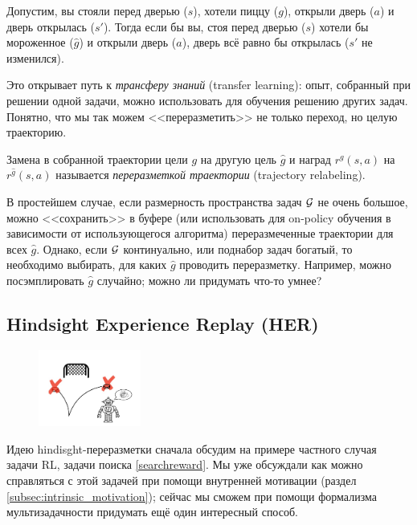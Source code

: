 \begin{example}
Допустим, вы стояли перед дверью ($s$), хотели пиццу ($g$), открыли дверь ($a$) и дверь открылась ($s'$). Тогда если бы вы, стоя перед дверью ($s$) хотели бы мороженное ($\hat{g}$) и открыли дверь ($a$), дверь всё равно бы открылась ($s'$ не изменился).
\end{example}

Это открывает путь к \emph{трансферу знаний} (transfer learning): опыт, собранный при решении одной задачи, можно использовать для обучения решению других задач. Понятно, что мы так можем <<переразметить>> не только переход, но целую траекторию.

\begin{definition}
Замена в собранной траектории цели $g$ на другую цель $\hat{g}$ и наград $r^g(s, a)$ на $r^{\hat{g}}(s, a)$ называется \emph{переразметкой траектории} (trajectory relabeling). 
\end{definition}

В простейшем случае, если размерность пространства задач $\mathcal{G}$ не очень большое, можно <<сохранить>> в буфере (или использовать для on-policy обучения в зависимости от использующегося алгоритма) переразмеченные траектории для всех $\hat{g}$. Однако, если $\mathcal{G}$ континуально, или поднабор задач богатый, то необходимо выбирать, для каких $\hat{g}$ проводить переразметку. Например, можно посэмплировать $\hat{g}$ случайно; можно ли придумать что-то умнее?

\subsection{Hindsight Experience Replay (HER)}

\begin{figure}
\vspace{-0.7cm}
\centering
\includegraphics[width=0.3\textwidth]{Images/HERres/HERres4.jpg}
\vspace{-0.7cm}
\end{figure}

Идею hindisght-переразметки сначала обсудим на примере частного случая задачи RL, задачи поиска \eqref{searchreward}. Мы уже обсуждали как можно справляться с этой задачей при помощи внутренней мотивации (раздел \ref{subsec:intrinsic_motivation}); сейчас мы сможем при помощи формализма мультизадачности придумать ещё один интересный способ.

